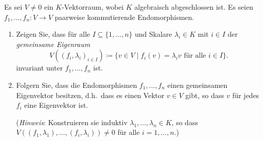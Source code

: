 \begin{question}[subtitle = Zur Existenz gemeinsamer Eigenvektoren]{3}
  Es sei $V \neq 0$ ein $K$-Vektorraum, wobei $K$ algebraisch abgeschlossen ist.
  Es seien $f_1, \dotsc, f_n \colon V \to V$ paarweise kommutierende Endomorphismen.
  \begin{enumerate}[leftmargin=*]
    \item
      Zeigen Sie, dass für alle $I \subseteq \{1, \dotsc, n\}$ und Skalare $\lambda_i \in K$ mit $i \in I$ der \emph{gemeinsame Eigenraum}
      \[
                   V( (f_i, \lambda_i)_{i \in I} )
        \coloneqq  \{ v \in V \mid \text{$f_i(v) = \lambda_i v$ für alle $i \in I$} \}.
      \]
      invariant unter $f_1, \dotsc, f_n$ ist.
     \item
      Folgern Sie, dass die Endomorphismen $f_1, \dotsc, f_n$ einen gemeinsamen Eigenvektor besitzen, d.h.\ dass es einen Vektor $v \in V$ gibt, so dass $v$ für jedes $f_i$ eine Eigenvektor ist.
      
      (\emph{Hinweis}: Konstruieren sie induktiv $\lambda_1, \dotsc, \lambda_n \in K$, so dass $V((f_1, \lambda_1), \dotsc, (f_i, \lambda_i)) \neq 0$ für alle $i = 1, \dotsc, n$.)
  \end{enumerate}
\end{question}


